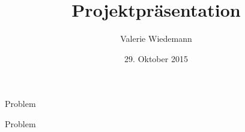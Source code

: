 \documentclass[11pt]{beamer}
\author{Valerie Wiedemann}
\title{Projektpräsentation}
\date{29. Oktober 2015}
\begin{document}
\begin{frame}
\titlepage
\end{frame}


\begin{frame}{Problem}
\begin{figure}[h]
\end{figure}
\end{frame}

\begin{frame}{Problem}
\begin{figure}[h]
\end{figure}
\end{frame}
\end{document}
